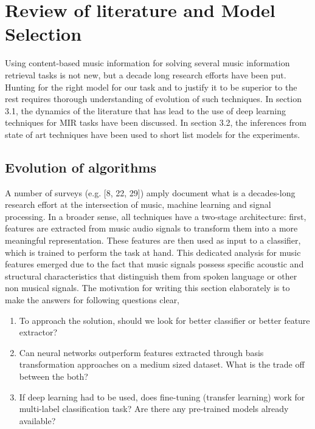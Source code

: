 \chapter{Review of literature and Model Selection } %

\label{Chapter3} %

Using content-based music information for solving several music information retrieval tasks is not new, but a decade long research efforts have been put. Hunting for the right model for our task and to justify it to be superior to the rest requires thorough understanding of evolution of such techniques. In section 3.1, the dynamics of the literature that has lead to the use of deep learning techniques for MIR tasks have been discussed. In section 3.2, the inferences from state of art techniques have been used to short list models for the experiments.       


\section{Evolution of algorithms}
A number of surveys (e.g. [8, 22, 29]) amply document what is a decades-long research effort at the intersection of music, machine learning and signal processing. In a broader sense, all techniques have a two-stage architecture: first, features are extracted from music audio signals to transform them into a more meaningful representation. These features are then used as input to a classifier, which is trained to perform the task at hand. This dedicated analysis for music features emerged due to the fact that music signals possess specific acoustic and structural characteristics that distinguish them from spoken language or other non musical signals. The motivation for writing this section elaborately is to make the answers for following questions clear,
\begin{enumerate}[label=(\alph*)]
\setlength\itemsep{0em}
\item To approach the solution, should we look for better classifier or better feature extractor?  
\item Can neural networks outperform features extracted through \gls{basis transformation} approaches on a medium sized dataset. What is the trade off between the both?
\item If deep learning had to be used, does fine-tuning (transfer learning) work for multi-label classification task? Are there any pre-trained models already available?
\end{enumerate}

